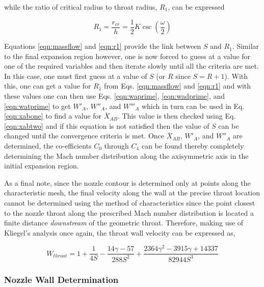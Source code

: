 	while the ratio of critical radius to throat radius, $R_1$, can be expressed

\begin{equation}
	R_1 = \frac{r_{cr}}{h} = \frac{1}{2}K \csc(\frac{\omega}{2})
\label{eqn:r1}	
\end{equation}

	Equations \ref{eqn:massflow} and \ref{eqn:r1} provide the link between $S$ and $R_1$.
Similar to the final expansion region however, one is now forced to guess at a value for one of the 
required variables and then iterate slowly until all the criteria are met.  In this case, one
must first guess at a value of $S$ (or $R$ since $S = R + 1$).  With this, one can get a value
for $R_1$ from Eqs. \ref{eqn:massflow} and \ref{eqn:r1} and with these values one can then use 
Eqs. \ref{eqn:waprime},
\ref{eqn:wadprime}, and \ref{eqn:watprime} to get $W'_A$, $W''_A$, and $W'''_A$ which in turn
can be used in Eq. \ref{eqn:xabone} to find a value for $\overline{X}_{AB}$.  This value is 
then checked using Eq. \ref{eqn:xabtwo} and if this equation is not satisfied then the value
of $S$ can be changed until the convergence criteria is met.  Once $\overline{X}_{AB}$,  
$W'_A$, and $W''_A$ are determined, the co-efficients $C_0$ through $C_4$ can be found thereby
completely determining the Mach number distribution along the axisymmetric axis in the initial
expansion region.

	As a final note, since the nozzle contour is determined only at points along the 
characteristic mesh, the final velocity along the wall at the precise throat location cannot
be determined using the method of characteristics since the point closest to the nozzle throat
along the prescribed Mach number distribution is located a finite distance \emph{downstream} of the
geometric throat.  Therefore, making use of Kliegel's analysis once again, the throat wall
velocity can be expressed as,

\begin{equation}
	W_{throat} = 1 + \frac{1}{4S} - \frac{14\gamma - 57}{288 S^2} + \frac{2364\gamma^2 - 3915\gamma + 14337}
	{82944S^3}
\label{eqn:uwall}
\end{equation}
	


\subsubsection{Nozzle Wall Determination}

